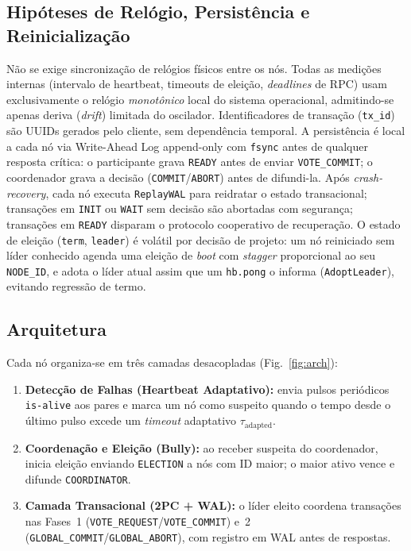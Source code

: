 \documentclass[conference]{IEEEtran}
\begin{document}
\subsection{Hipóteses de Relógio, Persistência e Reinicialização}
Não se exige sincronização de relógios físicos entre os nós. Todas as medições internas (intervalo de heartbeat, timeouts de eleição, \emph{deadlines} de RPC) usam exclusivamente o relógio \emph{monotônico} local do sistema operacional, admitindo-se apenas deriva (\emph{drift}) limitada do oscilador. Identificadores de transação (\texttt{tx\_id}) são UUIDs gerados pelo cliente, sem dependência temporal. A persistência é local a cada nó via Write-Ahead Log append-only com \texttt{fsync} antes de qualquer resposta crítica: o participante grava \texttt{READY} antes de enviar \texttt{VOTE\_COMMIT}; o coordenador grava a decisão (\texttt{COMMIT}/\texttt{ABORT}) antes de difundi-la. Após \emph{crash-recovery}, cada nó executa \texttt{ReplayWAL} para reidratar o estado transacional; transações em \texttt{INIT} ou \texttt{WAIT} sem decisão são abortadas com segurança; transações em \texttt{READY} disparam o protocolo cooperativo de recuperação. O estado de eleição (\texttt{term}, \texttt{leader}) é volátil por decisão de projeto: um nó reiniciado sem líder conhecido agenda uma eleição de \emph{boot} com \emph{stagger} proporcional ao seu \texttt{NODE\_ID}, e adota o líder atual assim que um \texttt{hb.pong} o informa (\texttt{AdoptLeader}), evitando regressão de termo.

\subsection{Arquitetura}
Cada nó organiza-se em três camadas desacopladas (Fig.~\ref{fig:arch}):
\begin{enumerate}
  \item \textbf{Detecção de Falhas (Heartbeat Adaptativo):} envia pulsos periódicos \texttt{is-alive} aos pares e marca um nó como suspeito quando o tempo desde o último pulso excede um \textit{timeout} adaptativo $\tau_{\text{adapted}}$.
  \item \textbf{Coordenação e Eleição (Bully):} ao receber suspeita do coordenador, inicia eleição enviando \texttt{ELECTION} a nós com ID maior; o maior ativo vence e difunde \texttt{COORDINATOR}.
  \item \textbf{Camada Transacional (2PC + WAL):} o líder eleito coordena transações nas Fases~1 (\texttt{VOTE\_REQUEST}/\texttt{VOTE\_COMMIT}) e~2 (\texttt{GLOBAL\_COMMIT}/\texttt{GLOBAL\_ABORT}), com registro em WAL antes de respostas.
\end{enumerate}
\end{document}
